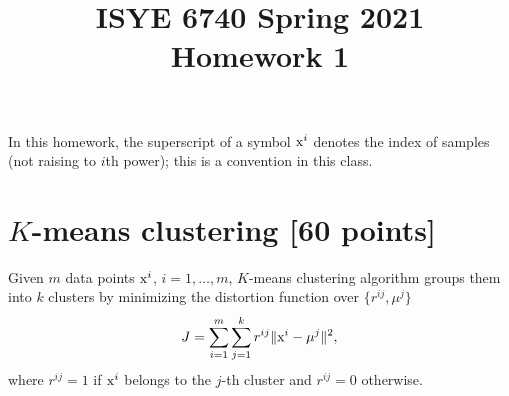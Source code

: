 \documentclass[twoside,10pt]{article}
\begin{document}
\title{ISYE 6740 Spring 2021\\ Homework 1}
\date{}

\maketitle

\vspace{-.5in}

In this homework, the superscript of a symbol $\text x^i$ denotes the index of samples (not raising to $i$th power); this is a convention in this class. 



\section{$K$-means clustering [60 points]}



Given $m$ data points $\text x^i$, $i=1,\dots, m$, $K$-means clustering algorithm groups them into $k$ clusters by minimizing the distortion function over $\{ r^{ij}, \mu^j \}$
\begin{equation}
J =\sum_{i=1}^m\sum_{j=1}^k r^{ij} \|\text x^i-\mu^j\|^2,
\label{J_def}
\end{equation}
where $r^{ij}=1$ if $\text x^i$ belongs to the $j$-th cluster and $r^{ij}=0$ otherwise.
\end{document}
